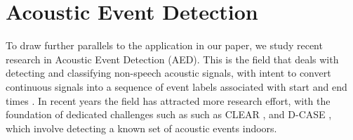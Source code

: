 \documentclass[12pt]{llncs}
\begin{document}
\section{Acoustic Event Detection}
\label{sec:AED}
To draw further parallels to the application in our paper, we study recent research in Acoustic Event Detection (AED). This is the field that deals with detecting and classifying non-speech acoustic signals, with intent to convert continuous signals into a sequence of event labels associated with start and end times \cite{espi2015exploiting}. In recent years the field has attracted more research effort, with the foundation of dedicated challenges such as such as CLEAR \cite{mostefa2007chil}, and D-CASE \cite{giannoulis2013detection}, which involve detecting a known set of acoustic events indoors.


\end{document}

